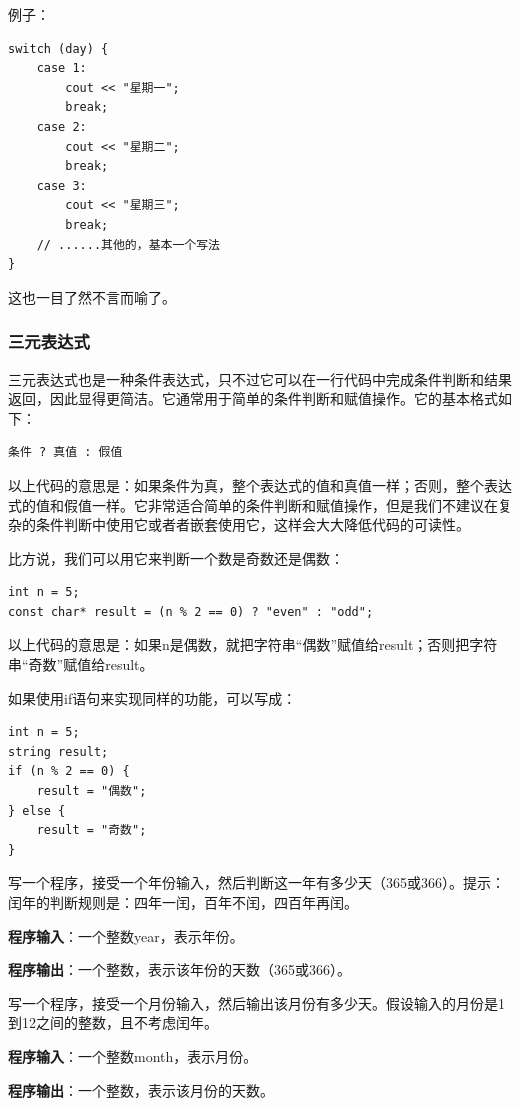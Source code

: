 例子：
\begin{verbatim}
switch (day) {
    case 1:
        cout << "星期一";
        break;
    case 2:
        cout << "星期二";
        break;
    case 3:
        cout << "星期三";
        break;
    // ......其他的，基本一个写法
}
\end{verbatim}
这也一目了然不言而喻了。

\subsubsection{三元表达式}

三元表达式也是一种条件表达式，只不过它可以在一行代码中完成条件判断和结果返回，因此显得更简洁。它通常用于简单的条件判断和赋值操作。它的基本格式如下：
\begin{verbatim}
条件 ? 真值 : 假值
\end{verbatim}
以上代码的意思是：如果条件为真，整个表达式的值和真值一样；否则，整个表达式的值和假值一样。它非常适合简单的条件判断和赋值操作，但是我们不建议在复杂的条件判断中使用它或者者嵌套使用它，这样会大大降低代码的可读性。

比方说，我们可以用它来判断一个数是奇数还是偶数：
\begin{verbatim}
int n = 5;
const char* result = (n % 2 == 0) ? "even" : "odd";
\end{verbatim}
以上代码的意思是：如果n是偶数，就把字符串“偶数”赋值给result；否则把字符串“奇数”赋值给result。

如果使用if语句来实现同样的功能，可以写成：
\begin{verbatim}
int n = 5;
string result;
if (n % 2 == 0) {
    result = "偶数";
} else {
    result = "奇数";
}
\end{verbatim}

\begin{exercise}[闰年判断]
    写一个程序，接受一个年份输入，然后判断这一年有多少天（365或366）。提示：闰年的判断规则是：四年一闰，百年不闰，四百年再闰。

    \textbf{程序输入}：一个整数year，表示年份。

    \textbf{程序输出}：一个整数，表示该年份的天数（365或366）。
\end{exercise}

\begin{exercise}[天数判断]
    写一个程序，接受一个月份输入，然后输出该月份有多少天。假设输入的月份是1到12之间的整数，且不考虑闰年。

    \textbf{程序输入}：一个整数month，表示月份。

    \textbf{程序输出}：一个整数，表示该月份的天数。
\end{exercise}

